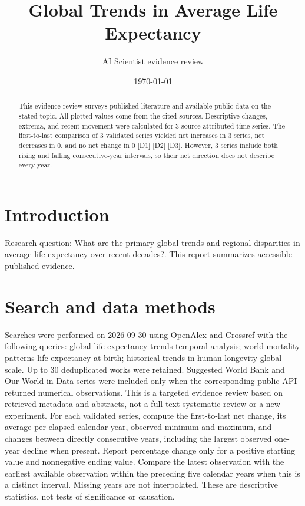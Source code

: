 \documentclass[10pt,a4paper]{article}
\title{Global Trends in Average Life Expectancy}
\author{AI Scientist evidence review}
\date{\today}
\begin{document}
\maketitle
\begin{abstract}
This evidence review surveys published literature and available public data on the stated topic. All plotted values come from the cited sources.
 Descriptive changes, extrema, and recent movement were calculated for 3 source-attributed time series. The first-to-last comparison of 3 validated series yielded net increases in 3 series, net decreases in 0, and no net change in 0 [D1] [D2] [D3]. However, 3 series include both rising and falling consecutive-year intervals, so their net direction does not describe every year.
\end{abstract}
\section{Introduction}
Research question: What are the primary global trends and regional disparities in average life expectancy over recent decades?. This report summarizes accessible published evidence.
\section{Search and data methods}
Searches were performed on 2026-09-30 using OpenAlex and Crossref with the following queries: global life expectancy trends temporal analysis; world mortality patterns life expectancy at birth; historical trends in human longevity global scale. Up to 30 deduplicated works were retained. Suggested World Bank and Our World in Data series were included only when the corresponding public API returned numerical observations. This is a targeted evidence review based on retrieved metadata and abstracts, not a full-text systematic review or a new experiment. For each validated series, compute the first-to-last net change, its average per elapsed calendar year, observed minimum and maximum, and changes between directly consecutive years, including the largest observed one-year decline when present. Report percentage change only for a positive starting value and nonnegative ending value. Compare the latest observation with the earliest available observation within the preceding five calendar years when this is a distinct interval. Missing years are not interpolated. These are descriptive statistics, not tests of significance or causation.
\end{document}
